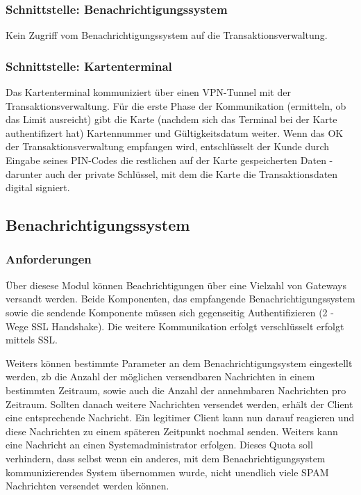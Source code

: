 \documentclass[12pt,a4paper,titlepage,oneside]{scrartcl}
\begin{document}
\subsubsection{Schnittstelle: Benachrichtigungssystem}
Kein Zugriff vom Benachrichtigungssystem auf die Transaktionsverwaltung.

\subsubsection{Schnittstelle: Kartenterminal}
Das Kartenterminal kommuniziert über einen VPN-Tunnel mit der Transaktionsverwaltung.
Für die erste Phase der Kommunikation (ermitteln, ob das Limit ausreicht) gibt die
Karte (nachdem sich das Terminal bei der Karte authentifizert hat) Kartennummer
und Gültigkeitsdatum weiter. Wenn das OK der Transaktionsverwaltung empfangen wird,
entschlüsselt der Kunde durch Eingabe seines PIN-Codes die restlichen auf der Karte
gespeicherten Daten - darunter auch der private Schlüssel, mit dem die Karte die
Transaktionsdaten digital signiert.

\subsection{Benachrichtigungssystem}
\subsubsection{Anforderungen}
Über diesese Modul können Beachrichtigungen über eine Vielzahl von Gateways
versandt werden. Beide Komponenten, das empfangende Benachrichtigungssystem sowie die sendende Komponente müssen sich gegenseitig Authentifizieren (2 - Wege SSL Handshake). Die weitere Kommunikation erfolgt verschlüsselt erfolgt mittels SSL.

Weiters können bestimmte Parameter an dem Benachrichtigungsystem eingestellt werden, zb die Anzahl der möglichen versendbaren Nachrichten in einem bestimmten Zeitraum, sowie auch die Anzahl der annehmbaren Nachrichten pro Zeitraum. Sollten danach weitere Nachrichten versendet werden, erhält der Client eine entsprechende Nachricht. Ein legitimer Client kann nun darauf reagieren und diese Nachrichten zu einem späteren Zeitpunkt nochmal senden. Weiters kann eine Nachricht an einen Systemadministrator erfolgen. Dieses Quota soll verhindern, dass selbst wenn ein anderes, mit dem Benachrichtigungsystem kommunizierendes System übernommen wurde, nicht unendlich viele SPAM Nachrichten versendet werden können.
\end{document}
